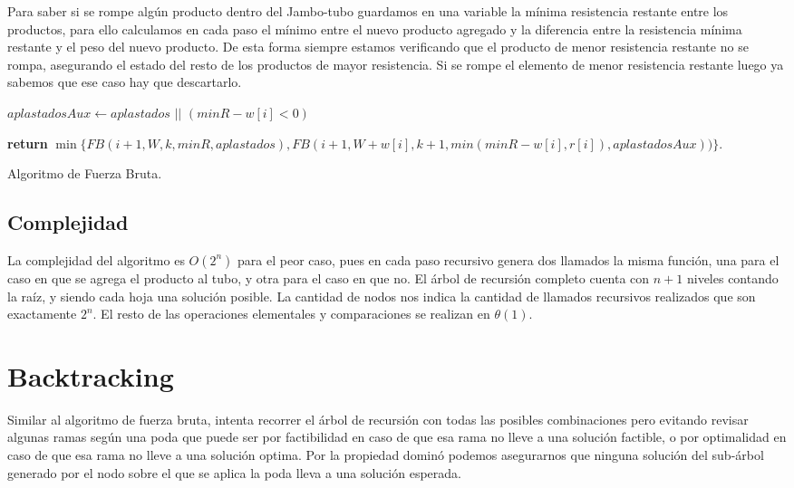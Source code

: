 \documentclass[10pt,a4paper]{article}
\begin{document}
Para saber si se rompe algún producto dentro del Jambo-tubo guardamos en una variable la mínima resistencia restante entre los productos, para ello calculamos en cada paso el mínimo entre el nuevo producto agregado y la diferencia entre la resistencia mínima restante y el peso del nuevo producto. De esta forma siempre estamos verificando que el producto de menor resistencia restante no se rompa, asegurando el estado del resto de los productos de mayor resistencia. Si se rompe el elemento de menor resistencia restante luego ya sabemos que ese caso hay que descartarlo.

\begin{algorithm}
	\begin{algorithmic}[1]

		\EndIf
		
		\State $aplastadosAux \leftarrow aplastados$ $||$ $(minR - w[i] < 0)$ 
		
		\State \textbf{return} $\min \{ FB(i+1, W, k, minR, aplastados), FB(i+1, W+w[i], k+1, min(minR - w[i], r[i]), aplastadosAux)) \}$.

		\EndFunction
	\end{algorithmic}
	\caption{Algoritmo de Fuerza Bruta.}
	\label{alg:fuerza_bruta}
\end{algorithm} 	

\subsection{Complejidad}
La complejidad del algoritmo es $O(2^n)$ para el peor caso, pues en cada paso recursivo genera dos llamados la misma función, una para el caso en que se agrega el producto al tubo, y otra para el caso en que no. El árbol de recursión completo cuenta con $n + 1$ niveles contando la raíz, y siendo cada hoja una solución posible. La cantidad de nodos nos indica la cantidad de llamados recursivos realizados que son exactamente $2^n$.
El resto de las operaciones elementales y comparaciones se realizan en $\theta(1)$.

\section{Backtracking} \label{sec:backtracking}
Similar al algoritmo de fuerza bruta, intenta recorrer el árbol de recursión con todas las posibles combinaciones pero evitando revisar algunas ramas según una poda que puede ser por factibilidad en caso de que esa rama no lleve a una solución factible, o por optimalidad en caso de que esa rama no lleve a una solución optima. Por la propiedad dominó podemos asegurarnos que ninguna solución del sub-árbol generado por el nodo sobre el que se aplica la poda lleva a una solución esperada.
\end{document}

